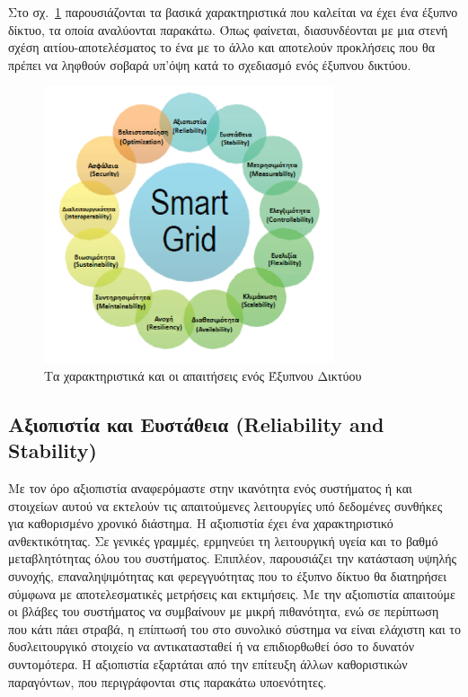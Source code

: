 \documentclass[12pt, a4paper, oneside]{report}
\begin{document}
Στο σχ.~\ref{eik3} παρουσιάζονται τα βασικά χαρακτηριστικά που καλείται να έχει ένα έξυπνο δίκτυο, τα οποία αναλύονται παρακάτω. Όπως φαίνεται, διασυνδέονται με μια στενή σχέση αιτίου-αποτελέσματος το ένα με το άλλο και αποτελούν προκλήσεις που θα πρέπει να ληφθούν σοβαρά υπ'όψη κατά το σχεδιασμό ενός έξυπνου δικτύου.
\begin{figure}[!h]
\centering
\includegraphics[width=0.76\textwidth]{eikona_03}
\caption[Τα χαρακτηριστικά και οι απαιτήσεις ενός Έξυπνου Δικτύου]{Τα χαρακτηριστικά και οι απαιτήσεις ενός Έξυπνου Δικτύου\cite{zwtou}}\label{eik3}
\end{figure}

\subsection*{Αξιοπιστία και Ευστάθεια (\textenglish{Reliability and Stability})}

Με τον όρο αξιοπιστία αναφερόμαστε στην ικανότητα ενός συστήματος ή και στοιχείων αυτού να εκτελούν τις απαιτούμενες λειτουργίες υπό δεδομένες συνθήκες για καθορισμένο χρονικό διάστημα. Η αξιοπιστία έχει ένα χαρακτηριστικό ανθεκτικότητας. Σε γενικές γραμμές, ερμηνεύει τη λειτουργική υγεία και το βαθμό μεταβλητότητας όλου του συστήματος. Επιπλέον, παρουσιάζει την κατάσταση υψηλής συνοχής, επαναληψιμότητας και φερεγγυότητας που το έξυπνο δίκτυο θα διατηρήσει σύμφωνα με αποτελεσματικές μετρήσεις και εκτιμήσεις. Με την αξιοπιστία απαιτούμε οι βλάβες του συστήματος να συμβαίνουν με μικρή πιθανότητα, ενώ σε περίπτωση που κάτι πάει στραβά, η επίπτωσή του στο συνολικό σύστημα να είναι ελάχιστη και το δυσλειτουργικό στοιχείο να αντικατασταθεί ή να επιδιορθωθεί όσο το δυνατόν συντομότερα. Η αξιοπιστία εξαρτάται από την επίτευξη άλλων καθοριστικών παραγόντων, που περιγράφονται στις παρακάτω υποενότητες.
\end{document}
